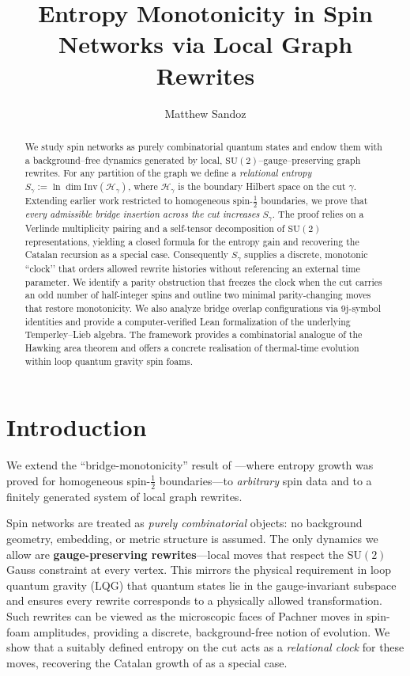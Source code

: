 \documentclass[11pt]{article}
\title{Entropy Monotonicity in Spin Networks via Local Graph Rewrites}
\author{Matthew Sandoz}
\newcommand{\SU}{\mathrm{SU}(2)}
\newcommand{\Inv}{\mathrm{Inv}}
\begin{document}
\maketitle

\begin{abstract}
We study spin networks as purely combinatorial quantum states and endow
them with a background--free dynamics generated by local,
$\mathrm{SU}(2)$--gauge--preserving graph rewrites.  For any partition of
the graph we define a \emph{relational entropy}
$S_{\gamma}:=\ln\!\dim\!\Inv(\mathcal H_\gamma)$, where
$\mathcal H_\gamma$ is the boundary Hilbert space on the cut
$\gamma$.  Extending earlier work restricted to homogeneous
spin-$\tfrac12$ boundaries, we prove that \emph{every admissible bridge
insertion across the cut increases $S_{\gamma}$}.  The proof relies on a
Verlinde multiplicity pairing and a self-tensor decomposition of
$\mathrm{SU}(2)$ representations, yielding a closed formula for the
entropy gain and recovering the Catalan recursion as a special case.
Consequently $S_{\gamma}$ supplies a discrete, monotonic “clock’’ that
orders allowed rewrite histories without referencing an external time
parameter.  We identify a parity obstruction that freezes the clock when
the cut carries an odd number of half-integer spins and outline two
minimal parity-changing moves that restore monotonicity. We also analyze
bridge overlap configurations via 9j-symbol identities and provide a
computer-verified Lean formalization of the underlying Temperley--Lieb algebra.  The framework
provides a combinatorial analogue of the Hawking area theorem and offers
a concrete realisation of thermal-time evolution within loop quantum
gravity spin foams.
\end{abstract}

\tableofcontents


\section{Introduction} We extend the ``bridge-monotonicity'' result of \cite{SandozBridgeMonotonicity2025}—where entropy growth was proved for homogeneous spin-$\tfrac12$ boundaries—to \emph{arbitrary} spin data and to a finitely generated system of local graph rewrites.

Spin networks are treated as \emph{purely combinatorial} objects: no background geometry, embedding, or metric structure is assumed. The only dynamics we allow are \textbf{gauge-preserving rewrites}—local moves that respect the $\SU$ Gauss constraint at every vertex. This mirrors the physical requirement in loop quantum gravity (LQG) that quantum states lie in the gauge-invariant subspace and ensures every rewrite corresponds to a physically allowed transformation. Such rewrites can be viewed as the microscopic faces of Pachner moves in spin-foam amplitudes, providing a discrete, background-free notion of evolution. We show that a suitably defined entropy on the cut acts as a \emph{relational clock} for these moves, recovering the Catalan growth of \cite{SandozBridgeMonotonicity2025} as a special case.
\end{document}
